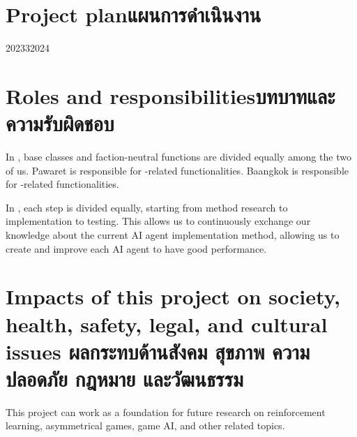 \section{\ifenglish Project plan\else แผนการดำเนินงาน\fi}

\begin{plan}{6}{2023}{3}{2024}
\end{plan}

\section{\ifenglish Roles and responsibilities\else บทบาทและความรับผิดชอบ\fi}
In \RootOurs{}, base classes and faction-neutral functions are divided equally among the two of us. Pawaret is responsible for \Marquise{}-related functionalities. Baangkok is responsible for \Eyrie{}-related functionalities.

In \RootAI{}, each step is divided equally, starting from method research to implementation to testing. This allows us to continuously exchange our knowledge about the current AI agent implementation method, allowing us to create and improve each AI agent to have good performance.

\section{\ifenglish%
Impacts of this project on society, health, safety, legal, and cultural issues
\else%
ผลกระทบด้านสังคม สุขภาพ ความปลอดภัย กฎหมาย และวัฒนธรรม
\fi}
This project can work as a foundation for future research on reinforcement learning, asymmetrical games, game AI, and other related topics.
